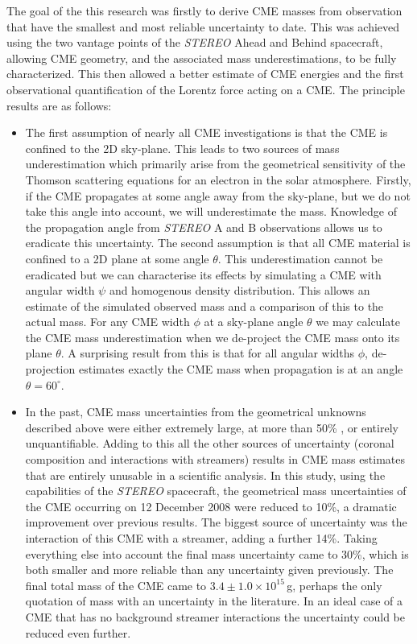 The goal of the this research was firstly to derive CME masses from observation that have the smallest and most reliable uncertainty to date. This was achieved using the two vantage points of the \emph{STEREO} Ahead and Behind spacecraft, allowing CME geometry, and the associated mass underestimations, to be fully characterized. This then allowed a better estimate of CME energies and the first observational quantification of the Lorentz force acting on a CME. The principle results are as follows:
\begin{itemize}
\item The first assumption of nearly all CME investigations is that the CME is confined to the 2D sky-plane. This leads to two sources of mass underestimation which primarily arise from the geometrical sensitivity of the Thomson scattering equations for an electron in the solar atmosphere. Firstly, if the CME propagates at some angle away from the sky-plane, but we do not take this angle into account, we will underestimate the mass. Knowledge of the propagation angle from \emph{STEREO} A and B observations allows us to eradicate this uncertainty. The second assumption is that all CME material is confined to a 2D plane at some angle $\theta$. This underestimation cannot be eradicated but we can characterise its effects by simulating a CME with angular width $\psi$ and homogenous density distribution. This allows an estimate of the simulated observed mass and a comparison of this to the actual mass. For any CME width $\phi$ at a sky-plane angle $\theta$ we may calculate the CME mass underestimation when we de-project the CME mass onto its plane $\theta$. A surprising result from this is that for all angular widths $\phi$, de-projection estimates exactly the CME mass when propagation is at an angle $\theta=60^{\circ}$.

\item In the past, CME mass uncertainties from the geometrical unknowns described above were either extremely large, at more than 50\% \citep{vou00}, or entirely unquantifiable. Adding to this all the other sources of uncertainty (coronal composition and interactions with streamers) results in CME mass estimates that are entirely unusable in a scientific analysis. In this study, using the capabilities of the \emph{STEREO} spacecraft, the geometrical mass uncertainties of the CME occurring on 12 December 2008 were reduced to 10\%, a dramatic improvement over previous results. The biggest source of uncertainty was the interaction of this CME with a streamer, adding a further 14\%. Taking everything else into account the final mass uncertainty came to 30\%, which is both smaller and more reliable than any uncertainty given previously. The final total mass of the CME came to
$3.4\pm1.0\times10^{15}$\,g, perhaps the only quotation of mass with an uncertainty in the literature. In an ideal case of a CME that has no background streamer interactions the uncertainty could be reduced even further.


\end{itemize}
